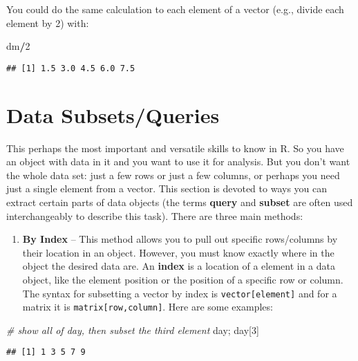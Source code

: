 \documentclass[]{book}
\newenvironment{Shaded}{\begin{snugshade}}{\end{snugshade}}
\newcommand{\DecValTok}[1]{\textcolor[rgb]{0.00,0.00,0.81}{#1}}
\newcommand{\CommentTok}[1]{\textcolor[rgb]{0.56,0.35,0.01}{\textit{#1}}}
\newcommand{\OperatorTok}[1]{\textcolor[rgb]{0.81,0.36,0.00}{\textbf{#1}}}
\newcommand{\NormalTok}[1]{#1}
\providecommand{\tightlist}{%
  \setlength{\itemsep}{0pt}\setlength{\parskip}{0pt}}
\theoremstyle{definition}
\theoremstyle{definition}
\theoremstyle{definition}
\theoremstyle{remark}
\begin{document}
You could do the same calculation to each element of a vector (e.g.,
divide each element by 2) with:

\begin{Shaded}
\begin{Highlighting}[]
\NormalTok{dm}\OperatorTok{/}\DecValTok{2}
\end{Highlighting}
\end{Shaded}

\begin{verbatim}
## [1] 1.5 3.0 4.5 6.0 7.5
\end{verbatim}

\section{Data Subsets/Queries}\label{sub}

This perhaps the most important and versatile skills to know in R. So
you have an object with data in it and you want to use it for analysis.
But you don't want the whole data set: just a few rows or just a few
columns, or perhaps you need just a single element from a vector. This
section is devoted to ways you can extract certain parts of data objects
(the terms \textbf{query} and \textbf{subset} are often used
interchangeably to describe this task). There are three main methods:

\begin{enumerate}
\def\labelenumi{\arabic{enumi}.}
\tightlist
\item
  \textbf{By Index} -- This method allows you to pull out specific
  rows/columns by their location in an object. However, you must know
  exactly where in the object the desired data are. An \textbf{index} is
  a location of a element in a data object, like the element position or
  the position of a specific row or column. The syntax for subsetting a
  vector by index is \texttt{vector{[}element{]}} and for a matrix it is
  \texttt{matrix{[}row,column{]}}. Here are some examples:
\end{enumerate}

\begin{Shaded}
\begin{Highlighting}[]
\CommentTok{# show all of day, then subset the third element}
\NormalTok{day; day[}\DecValTok{3}\NormalTok{]}
\end{Highlighting}
\end{Shaded}

\begin{verbatim}
## [1] 1 3 5 7 9
\end{verbatim}
\end{document}
